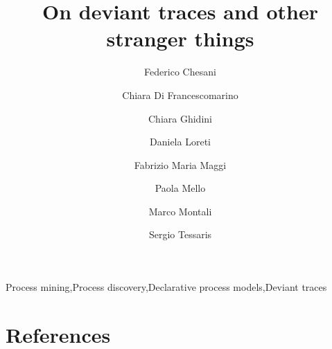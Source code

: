 \documentclass[review]{elsarticle}
\newcommand{\tcolor}[2]{\color{#1}{#2}\color{black}}
\theoremstyle{definition}
\begin{document}
\begin{frontmatter}

\title{On deviant traces and other stranger things}

\author[disi]{Federico Chesani}
\author[fbk]{Chiara Di Francescomarino}
\author[fbk]{Chiara Ghidini}
\author[disi]{Daniela Loreti}

\author[unibz]{Fabrizio Maria Maggi}
\author[disi]{Paola Mello}
\author[unibz]{Marco Montali}
\author[unibz]{Sergio Tessaris}

\address[disi]{DISI - University of Bologna, Italy}
\address[fbk]{Fondazione Bruno Kessler, Trento, Italy}
\address[unibz]{Free University of Bozen/Bolzano, Italy}




\begin{abstract}
\tcolor{blue}{abstract goes here}
\end{abstract}

\begin{keyword}
Process mining\sep Process discovery\sep Declarative process models\sep Deviant traces
\end{keyword}

\end{frontmatter}

\linenumbers












\section*{References}



\end{document}
